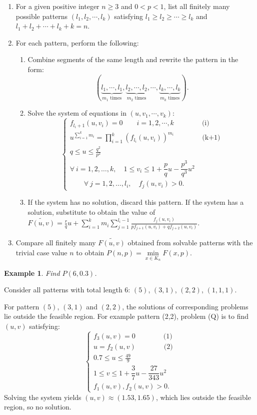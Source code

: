 \documentclass[a4paper,fleqn,numbers]{cas-sc}
\newtheorem{example}[theorem]{Example}
\begin{document}
	\begin{enumerate}
		\item For a given positive integer $n\geq 3$ and $0<p<1$, list all finitely many possible patterns $(l_1,l_2,\cdots,l_k)$ satisfying $l_1\geq l_2\geq\cdots\geq l_k$ and $l_1+ l_2+\cdots+ l_k +k=n$.
		\item For each pattern, perform the following:
		\begin{enumerate}
			\item Combine segments of the same length and rewrite the pattern in the form:
			\[
			(\underbrace{l_1,\cdots,l_1}_{m_1\text{ times}},\underbrace{l_2,\cdots,l_2}_{m_2\text{ times}},\cdots,\underbrace{l_k,\cdots,l_k}_{m_k\text{ times}}).
			\]
			\item Solve the system of equations in $(u, v_1, \cdots, v_k)$:
			\[
			\left\{
			\begin{array}{l}
				f_{l_i+1}(u, v_i) = 0 \quad \quad i=1,2,\cdots,k \qquad \qquad\text{(i)}\\
				u^{\sum_{i=1}^{k}m_i} = \prod_{i=1}^{k}(f_{l_i}(u,v_i))^{m_i} \qquad\qquad \text{(k+1)}\\
				q\leq u\leq\frac{q^2}{p^2}\\
				\forall~i=1,2,\ldots,k, \quad 1 \leq v_i \leq 1 + \dfrac{p}{q}u - \dfrac{p^3}{q^3}u^2\\
				\qquad\forall~j=1,2,\ldots,l_i, \quad f_j(u,v_i) > 0.
			\end{array}
			\right.
			\tag{Q}
			\]
			\item If the system has no solution, discard this pattern. If the system has a solution, substitute to obtain the value of $\widetilde{F(u,v)}= \frac{r}{q} u + \sum_{i=1}^k m_i \sum_{j=1}^{l_i - 1} \frac{f_j(u,v_i)}{p f_{j+1}(u,v_i) + q f_{j+2}(u,v_i)}$.
		\end{enumerate}
		\item Compare all finitely many $\widetilde{F(u,v)}$ obtained from solvable patterns with the trivial case value $n$ to obtain $P(n,p)=\min\limits_{x \in K_n}F(x,p)$.
	\end{enumerate}
	
	\begin{example}
		Find $P(6,0.3)$.
	\end{example}
	
	Consider all patterns with total length $6$: $(5)$, $(3,1)$, $(2,2)$, $(1,1,1)$.
	
	For pattern $(5)$, $(3,1)$ and $(2,2)$, the solutions of corresponding problems lie outside the feasible region. For example pattern (2,2), problem (Q) is to find $(u, v)$ satisfying:
	\[
	\left\{
	\begin{array}{l}
		f_{3}(u, v) = 0 \qquad \qquad\text{(1)}\\
		u= f_{2}(u,v) \qquad\qquad \text{(2)}\\
		0.7\leq u\leq \frac{49}{9}\\
		1 \leq v \leq 1 + \dfrac{3}{7}u - \dfrac{27}{343}u^2\\
		f_1(u,v),f_2(u,v)> 0.
	\end{array}
	\right.
	\tag{Q}
	\]
	Solving the system yields $(u,v)\approx(1.53,1.65)$, which lies outside the feasible region, so no solution.
	
\end{document}
